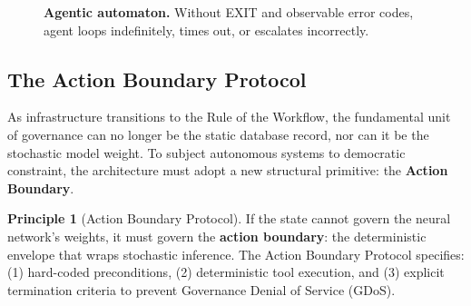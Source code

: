 \documentclass[11pt,a4paper]{article}
\theoremstyle{definition}
\newtheorem{principle}{Principle}[section]
\begin{document}
\begin{figure}[htbp]
\centering
{}
\caption{\textbf{Agentic automaton.} Without EXIT and observable error codes, agent loops indefinitely, times out, or escalates incorrectly.}
\label{fig:agentic-automaton}
\end{figure}

\subsection{The Action Boundary Protocol}
\label{subsec:action-boundary}

As infrastructure transitions to the Rule of the Workflow, the fundamental unit of governance can no longer be the static database record, nor can it be the stochastic model weight. To subject autonomous systems to democratic constraint, the architecture must adopt a new structural primitive: the \textbf{Action Boundary}.

\begin{principle}[Action Boundary Protocol]
If the state cannot govern the neural network's weights, it must govern the \textbf{action boundary}: the deterministic envelope that wraps stochastic inference. The Action Boundary Protocol specifies: (1) hard-coded preconditions, (2) deterministic tool execution, and (3) explicit termination criteria to prevent Governance Denial of Service (GDoS).
\end{principle}
\end{document}
